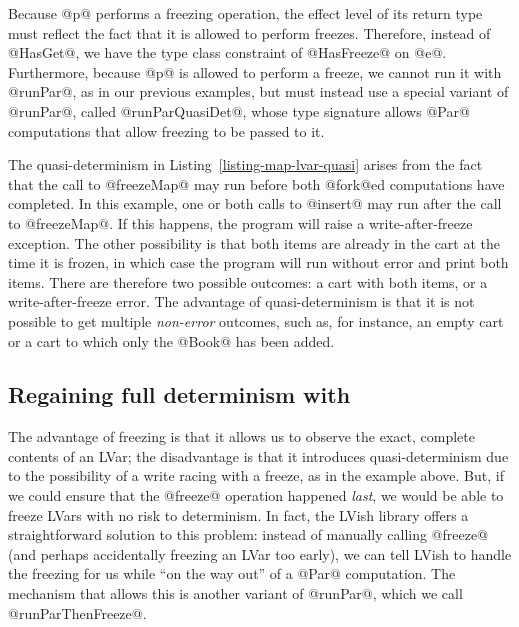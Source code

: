 Because @p@ performs a freezing operation, the effect level of its
return type must reflect the fact that it is allowed to perform
freezes.  Therefore, instead of @HasGet@, we have the type class
constraint of @HasFreeze@ on @e@.  Furthermore, because @p@ is allowed
to perform a freeze, we cannot run it with @runPar@, as in our
previous examples, but must instead use a special variant of @runPar@,
called @runParQuasiDet@, whose type signature allows @Par@
computations that allow freezing to be passed to it.

The quasi-determinism in Listing~\ref{listing-map-lvar-quasi} arises
from the fact that the call to @freezeMap@ may run before both
@fork@ed computations have completed.  In this example, one or both
calls to @insert@ may run after the call to @freezeMap@.  If this
happens, the program will raise a write-after-freeze exception.  The
other possibility is that both items are already in the cart at the
time it is frozen, in which case the program will run without error
and print both items.  There are therefore two possible outcomes: a
cart with both items, or a write-after-freeze error.  The advantage of
quasi-determinism is that it is not possible to get multiple
\emph{non-error} outcomes, such as, for instance, an empty cart or a
cart to which only the @Book@ has been added.

\subsection{Regaining full determinism with }\label{subsection:lvish-regaining-full-determinism-with-runparthenfreeze}

The advantage of freezing is that it allows us to observe the exact,
complete contents of an LVar; the disadvantage is that it introduces
quasi-determinism due to the possibility of a write racing with a
freeze, as in the example above.  But, if we could ensure that the
@freeze@ operation happened \emph{last}, we would be able to freeze
LVars with no risk to determinism.  In fact, the LVish library offers
a straightforward solution to this problem: instead of manually
calling @freeze@ (and perhaps accidentally freezing an LVar too
early), we can tell LVish to handle the freezing for us while ``on the
way out'' of a @Par@ computation.  The mechanism that allows this is
another variant of @runPar@, which we call @runParThenFreeze@.

\singlespacing

\doublespacing

